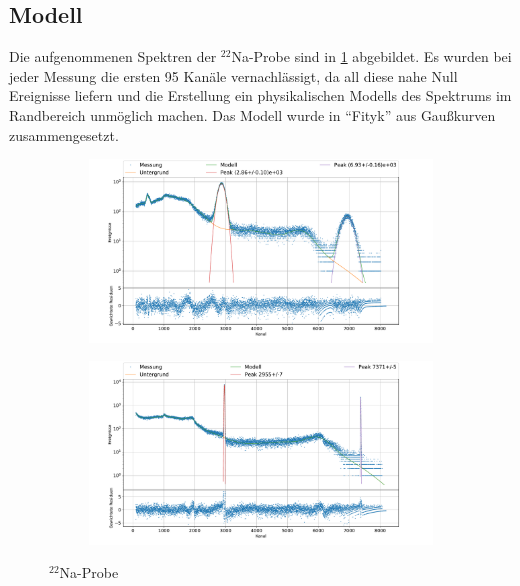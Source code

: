\documentclass[
	a4paper,
	12pt,
	pagesize,
	ngerman
]{scrartcl}
\begin{document}
	\subsection{Modell}
	Die aufgenommenen Spektren der $^{22}$Na-Probe sind in \cref{fg_Na_ch} abgebildet.
	Es wurden bei jeder Messung die ersten 95 Kanäle vernachlässigt, da all diese nahe Null Ereignisse liefern und die Erstellung ein physikalischen Modells des Spektrums im Randbereich unmöglich machen. %
	Das Modell wurde in \enquote{Fityk} aus Gaußkurven zusammengesetzt.
	\begin{figure}[H]
		\centering
		\begin{subfigure}[c]{\textwidth}
			\centering
			\includegraphics[width= 1 \linewidth]{img/NaNaCh.pdf}
		\end{subfigure}
		\begin{subfigure}[c]{\textwidth}
			\centering
			\includegraphics[width= 1 \linewidth]{img/NaGeCh.pdf}
		\end{subfigure}
		\caption{$^{22}$Na-Probe}
		\label{fg_Na_ch}
	\end{figure}
\end{document}
